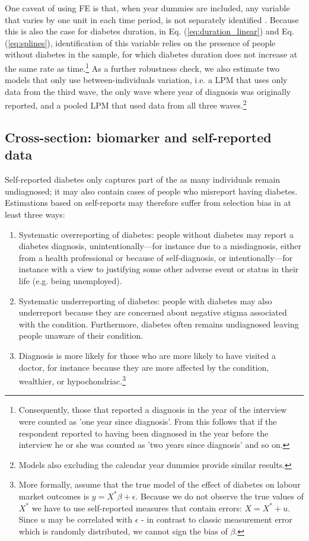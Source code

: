 One caveat of using \ac{FE} is that, when year dummies are included, any variable that varies by one unit in each time period, is not separately identified \parencite{Wooldridge2012}. Because this is also the case for diabetes duration, in Eq. (\ref{eq:duration_linear}) and Eq. (\ref{eq:splines}), identification of this variable relies on the presence of people without diabetes in the sample, for which diabetes duration does not increase at the same rate as time.\footnote{Consequently, those that reported a diagnosis in the year of the interview were counted as 'one year since diagnosis'. From this follows that if the respondent reported to having been diagnosed in the year before the interview he or she was counted as 'two years since diagnosis' and so on.} As a further robustness check, we also estimate two models that only use between-individuals variation, i.e. a \ac{LPM} that uses only data from the third wave, the only wave where year of diagnosis was originally reported, and a pooled \ac{LPM} that used data from all three waves.\footnote{Models also excluding the calendar year dummies provide similar results.}

\subsection{\label{sec:Biomarker Strategy}Cross-section: biomarker and self-reported data}

Self-reported diabetes only captures part of the \DIFdelbegin {}\DIFdelend \DIFaddbegin {}\DIFaddend as many individuals remain undiagnosed; it may also contain cases of people who misreport having diabetes.  Estimations based on self-reports may therefore suffer from selection bias in at least three ways:

\begin{enumerate}
\item Systematic overreporting of diabetes: people without diabetes
may report a diabetes diagnosis, unintentionally---for instance due to a misdiagnosis, either from a health professional or because of self-diagnosis, or intentionally---for instance with a view to justifying some other adverse event or status in their life (e.g. being unemployed). 
\item Systematic underreporting of diabetes: people with diabetes may also underreport because they are concerned about negative stigma associated with the condition. Furthermore, diabetes often remains undiagnosed leaving people unaware of their condition.
\item Diagnosis is more likely for those who are more likely to have visited a doctor, for instance because they are more affected by the condition, wealthier, or hypochondriac.\footnote{More formally, assume that the true model of the effect of diabetes on labour market outcomes is $y=X^{*}\beta+\epsilon$. Because we do not observe the true values of  $X^{*}$  we have to use self-reported measures that contain errors: $X=X^{*} + u$. Since $u$ may be correlated with $\epsilon$ - in contrast to classic measurement error which is randomly distributed, we cannot sign the bias of  $\beta$.}    
\end{enumerate} 

